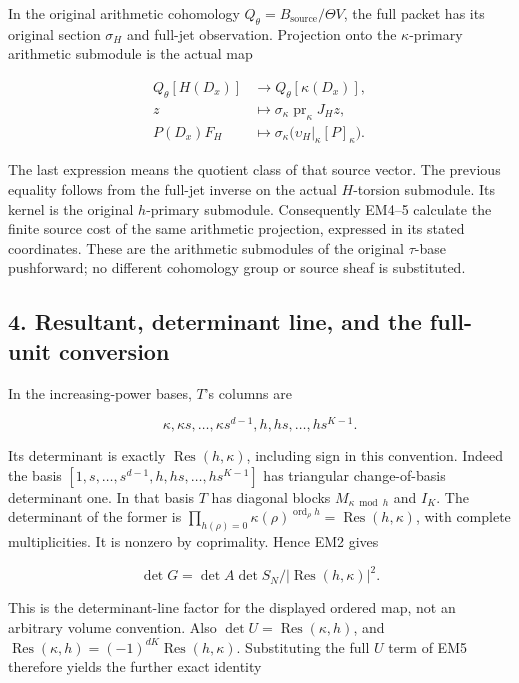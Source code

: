 In the original arithmetic cohomology \(Q_\theta=B_{\mathrm{source}}/\Theta V\), the
full packet has its original section \(\sigma_H\) and full-jet observation.
Projection onto the \(\kappa\)-primary arithmetic submodule is the actual map

\[
\begin{aligned}Q_\theta[H(D_x)]&\longrightarrow Q_\theta[\kappa(D_x)],\\z&\longmapsto\sigma_\kappa\operatorname{pr}_\kappa J_Hz,\\P(D_x)F_H&\longmapsto\sigma_\kappa\bigl(\upsilon_H|_\kappa[P]_\kappa\bigr).\end{aligned}\tag{EM6}
\]

The last expression means the quotient class of that source vector.
The previous equality follows from the full-jet inverse on the actual
\(H\)-torsion submodule. Its kernel is the original \(h\)-primary submodule.
Consequently EM4--5 calculate the finite source cost of the same
arithmetic projection, expressed in its stated coordinates. These are
the arithmetic submodules of the original \(\tau\)-base pushforward; no
different cohomology group or source sheaf is substituted.

\subsection{4. Resultant, determinant line, and the full-unit conversion}\label{resultant-determinant-line-and-the-full-unit-conversion}

In the increasing-power bases, \(T\)'s columns are

\[
\kappa,\kappa s,\ldots,\kappa s^{d-1},h,hs,\ldots,hs^{K-1}.
\]

Its determinant is exactly \(\operatorname{Res}(h,\kappa)\), including sign in this convention.
Indeed the basis \([1,s,\ldots,s^{d-1},h,hs,\ldots,hs^{K-1}]\) has triangular
change-of-basis determinant one. In that basis \(T\) has diagonal blocks
\(M_{\kappa\bmod h}\) and \(I_K\). The determinant of the former is
\(\prod_{h(\rho)=0}\kappa(\rho)^{\operatorname{ord}_\rho h}=\operatorname{Res}(h,\kappa)\), with complete
multiplicities. It is nonzero by coprimality. Hence EM2 gives

\[
\det G=\det A\det S_N/|\operatorname{Res}(h,\kappa)|^2.\tag{EM7}
\]

This is the determinant-line factor for the displayed ordered map, not
an arbitrary volume convention. Also \(\det U=\operatorname{Res}(\kappa,h)\), and
\(\operatorname{Res}(\kappa,h)=(-1)^{dK}\operatorname{Res}(h,\kappa)\). Substituting the full \(U\) term of
EM5 therefore yields the further exact identity

